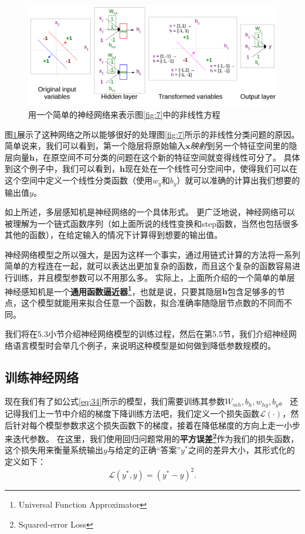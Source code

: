 \documentclass[10pt,a4paper]{ctexart}
\begin{document}
\begin{figure}[H]
\centering
\includegraphics[width=1\textwidth]{fig8.png}
\caption{用一个简单的神经网络来表示图\ref{fig:7}中的非线性方程}
\label{fig:8}
\end{figure}

图\ref{fig:8}展示了这种网络之所以能够很好的处理图\ref{fig:7}所示的非线性分类问题的原因。
简单说来，我们可以看到，第一个隐层将原始输入$\textbf{x}$\textit{映射}到另一个特征空间里的隐层向量$\textbf{h}$，在原空间不可分类的问题在这个新的特征空间就变得线性可分了。
具体到这个例子中，我们可以看到，$\textbf{h}$现在处在一个线性可分空间中，使得我们可以在这个空间中定义一个线性分类函数（使用$w_y$和$b_y$）就可以准确的计算出我们想要的输出值$y$。

如上所述，多层感知机是神经网络的一个具体形式。
更广泛地说，神经网络可以被理解为一个链式函数序列（如上面所说的线性变换和step函数，当然也包括很多其他的函数），在给定输入的情况下计算得到想要的输出值。

神经网络模型之所以强大，是因为这样一个事实，通过用链式计算的方法将一系列简单的方程连在一起，就可以表达出更加复杂的函数，而且这个复杂的函数容易进行训练，并且模型参数可以不用那么多。
实际上，上面所介绍的一个简单的单层神经感知机是一个\textbf{通用函数逼近器\footnote{Universal Function Approximator}}\cite{hornik1989multilayer}，也就是说，只要其隐层$\textbf{h}$包含足够多的节点，这个模型就能用来拟合任意一个函数，拟合准确率随隐层节点数的不同而不同。

我们将在5.3小节介绍神经网络模型的训练过程，然后在第5.5节，我们介绍神经网络语言模型时会举几个例子，来说明这种模型是如何做到降低参数规模的。

\subsection{训练神经网络}
现在我们有了如公式\ref{eq:34}所示的模型，我们需要训练其参数$W_{mh},b_{h},w_{hy},b_y$。
还记得我们上一节中介绍的梯度下降训练方法吧，我们定义一个损失函数$\mathcal{L}(\cdot)$，然后针对每个模型参数求这个损失函数下的梯度，接着在降低梯度的方向上走一小步来迭代参数。
在这里，我们使用回归问题常用的\textbf{平方误差\footnote{Squared-error Loss}}作为我们的损失函数，这个损失用来衡量系统输出$y$与给定的正确“答案”$y^*$之间的差异大小，其形式化的定义如下：
\begin{equation}\label{eq:36}
 \mathcal{L}(y^*,y) = (y^* - y)^2.
\end{equation}
\end{document}
